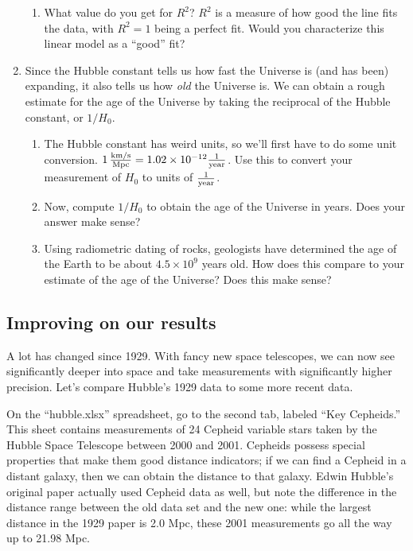 \documentclass[11pt]{article}
\begin{document}
\begin{enumerate}
\begin{enumerate}
            \item What value do you get for $R^2$? $R^2$ is a measure of how good the line fits the data, with $R^2 = 1$ being a perfect fit. Would you characterize this linear model as a ``good'' fit?
        \end{enumerate}
        
    \item Since the Hubble constant tells us how fast the Universe is (and has been) expanding, it also tells us how \emph{old} the Universe is. We can obtain a rough estimate for the age of the Universe by taking the reciprocal of the Hubble constant, or $1/H_0$.
    \begin{enumerate}
        \item The Hubble constant has weird units, so we'll first have to do some unit conversion. $1 \rm \, \frac{km/s}{Mpc} = 1.02 \times 10^{-12} \frac{1}{year}$. Use this to convert your measurement of $H_0$ to units of $\frac{1}{\rm year}$.
        
        \item Now, compute $1/H_0$ to obtain the age of the Universe in years. Does your answer make sense?
        
        \item Using radiometric dating of rocks, geologists have determined the age of the Earth to be about $4.5 \times 10^9$ years old. How does this compare to your estimate of the age of the Universe? Does this make sense?
    \end{enumerate}
\end{enumerate}

\subsection{Improving on our results}

A lot has changed since 1929. With fancy new space telescopes, we can now see significantly deeper into space and take measurements with significantly higher precision. Let's compare Hubble's 1929 data to some more recent data.

On the ``hubble.xlsx'' spreadsheet, go to the second tab, labeled ``Key Cepheids.'' This sheet contains measurements of 24 Cepheid variable stars taken by the Hubble Space Telescope between 2000 and 2001. Cepheids possess special properties that make them good distance indicators; if we can find a Cepheid in a distant galaxy, then we can obtain the distance to that galaxy. Edwin Hubble's original paper actually used Cepheid data as well, but note the difference in the distance range between the old data set and the new one: while the largest distance in the 1929 paper is 2.0 Mpc, these 2001 measurements go all the way up to 21.98 Mpc.
\end{document}
